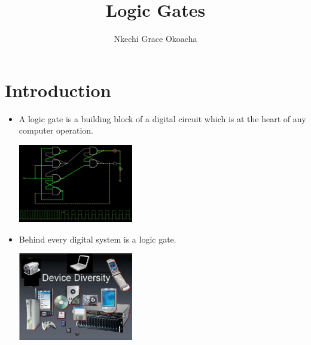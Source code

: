 \documentclass[10pt,a4paper,onecolumn]{article}
\begin{document}
	\title{Logic Gates}
	\author{Nkechi Grace Okoacha}
	\maketitle
\tableofcontents
	
\newpage
\section{Introduction}
\label{intro}
	\begin{itemize}
		\item A logic gate is a building block of a digital circuit which is at the heart of any computer operation. \\
		
	\begin{center}\includegraphics[width=5cm]{gst1.jpg}\end{center}
		
		\item Behind every digital system is a logic gate. \\
		
		\begin{center}\includegraphics[width=5cm]{gst2.jpg}\end{center}
		

\end{itemize}
\end{document}
